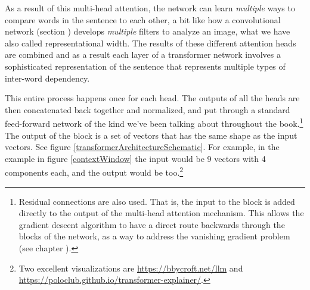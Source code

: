 
As a result of this multi-head attention, the network can learn \emph{multiple} ways to compare words in the sentence to each other, a bit like how a convolutional network (section ) develops \emph{multiple} filters to analyze an image, what we have also called representational width. The results of these different attention heads are combined and as a result each layer of a transformer network involves a sophisticated representation of the sentence that represents multiple types of inter-word dependency. 

This entire process happens once for each head. The outputs of all the heads are then concatenated back together and normalized, and put through a standard feed-forward network of the kind we've been talking about throughout the book.\footnote{Residual connections are also used. That is, the input to the block is added directly to the output of the multi-head attention mechanism. This allows the gradient descent algorithm to have a direct route backwards through the blocks of the network, as a way to address the vanishing gradient problem (see chapter ). }  The output of the block is a set of vectors that has the same shape as the input vectors. See figure \ref{transformerArchitectureSchematic}. For example, in the example in figure \ref{contextWindow} the input would be 9 vectors with 4 components each, and the output would be too.\footnote{Two excellent visualizations are \url{https://bbycroft.net/llm} and \url{https://poloclub.github.io/transformer-explainer/}.}

